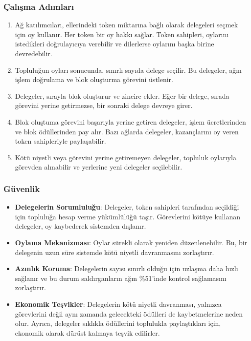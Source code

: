 \subsubsection{Çalışma Adımları}

\begin{enumerate}
    \item Ağ katılımcıları, ellerindeki token miktarına bağlı olarak delegeleri seçmek için oy kullanır. Her token bir oy hakkı sağlar. Token sahipleri, oylarını istedikleri doğrulayıcıya verebilir ve dilerlerse oylarını başka birine devredebilir.
    \item Topluluğun oyları sonucunda, sınırlı sayıda delege seçilir. Bu delegeler, ağın işlem doğrulama ve blok oluşturma görevini üstlenir.
    \item Delegeler, sırayla blok oluşturur ve zincire ekler. Eğer bir delege, sırada görevini yerine getirmezse, bir sonraki delege devreye girer.
    \item Blok oluştuma görevini başarıyla yerine getiren delegeler, işlem ücretlerinden ve blok ödüllerinden pay alır. Bazı ağlarda delegeler, kazançlarını oy veren token sahipleriyle paylaşabilir.
    \item Kötü niyetli veya görevini yerine getiremeyen delegeler, topluluk oylarıyla görevden alınabilir ve yerlerine yeni delegeler seçilebilir.
\end{enumerate}

\subsubsection{Güvenlik}

\begin{itemize}
    \item \textbf{Delegelerin Sorumluluğu}: Delegeler, token sahipleri tarafından seçildiği için topluluğa hesap verme yükümlülüğü taşır. Görevlerini kötüye kullanan delegeler, oy kaybederek sistemden dışlanır.
    \item \textbf{Oylama Mekanizması}: Oylar sürekli olarak yeniden düzenlenebilir. Bu, bir delegenin uzun süre sistemde kötü niyetli davranmasını zorlaştırır.
    \item \textbf{Azınlık Koruma}: Delegelerin sayısı sınırlı olduğu için uzlaşma daha hızlı sağlanır ve bu durum saldırganların ağın \%51'inde kontrol sağlamasını zorlaştırır.
    \item \textbf{Ekonomik Teşvikler}: Delegelerin kötü niyetli davranması, yalnızca görevlerini değil aynı zamanda gelecekteki ödülleri de kaybetmelerine neden olur. Ayrıca, delegeler sıklıkla ödüllerini toplulukla paylaştıkları için, ekonomik olarak dürüst kalmaya teşvik edilirler.
\end{itemize}

